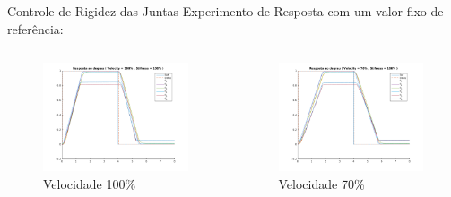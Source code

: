\documentclass{beamer}
\begin{document}
\begin{frame}{Controle de Rigidez das Juntas}
Experimento de Resposta com um valor fixo de referência:
\begin{columns}
\begin{column}{0.5\textwidth}
   \begin{figure}
    \centering
    \includegraphics[width = \linewidth]{tex/figs/jointIdentification_exp1v100v100.png}
    \caption{Velocidade 100\%}
    \label{fig:mekademo}
\end{figure}
\end{column}
\begin{column}{0.5\textwidth}  %
    \begin{figure}
    \centering
    \includegraphics[width = \linewidth]{tex/figs/jointIdentification_exp3v70v100.png}
    \caption{Velocidade 70\%}
    \label{fig:mekademo}
\end{figure}
\end{column}
\end{columns}
\end{frame}
\end{document}
